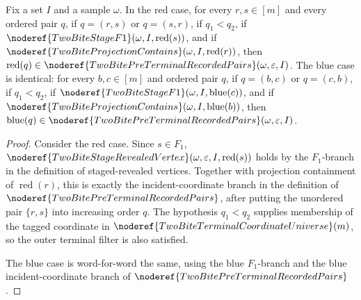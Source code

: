 \begin{helper}
Fix a set \(I\) and a sample \(\omega\).  In the red case, for every
\(r,s\in[m]\) and every ordered pair \(q\), if
\(q=(r,s)\) or \(q=(s,r)\), if \(q_1<q_2\), if
\(\noderef{TwoBiteStageF1}(\omega,I,\operatorname{red}(s))\), and if
\(\noderef{TwoBiteProjectionContains}(\omega,I,\operatorname{red}(r))\), then
\(\operatorname{red}(q)\in
\noderef{TwoBitePreTerminalRecordedPairs}(\omega,\varepsilon,I)\).  The blue
case is identical: for every \(b,c\in[m]\) and ordered pair \(q\), if
\(q=(b,c)\) or \(q=(c,b)\), if \(q_1<q_2\), if
\(\noderef{TwoBiteStageF1}(\omega,I,\operatorname{blue}(c))\), and if
\(\noderef{TwoBiteProjectionContains}(\omega,I,\operatorname{blue}(b))\), then
\(\operatorname{blue}(q)\in
\noderef{TwoBitePreTerminalRecordedPairs}(\omega,\varepsilon,I)\).
\end{helper}
\begin{proof}
Consider the red case.  Since \(s\in F_1\),
\(\noderef{TwoBiteStageRevealedVertex}(\omega,\varepsilon,I,\operatorname{red}(s))\)
holds by the \(F_1\)-branch in the definition of staged-revealed vertices.
Together with projection containment of \(\operatorname{red}(r)\), this is
exactly the incident-coordinate branch in the definition of
\(\noderef{TwoBitePreTerminalRecordedPairs}\), after putting the unordered
pair \(\{r,s\}\) into increasing order \(q\).  The hypothesis
\(q_1<q_2\) supplies membership of the tagged coordinate in
\(\noderef{TwoBiteTerminalCoordinateUniverse}(m)\), so the outer terminal
filter is also satisfied.

The blue case is word-for-word the same, using the blue \(F_1\)-branch and
the blue incident-coordinate branch of
\(\noderef{TwoBitePreTerminalRecordedPairs}\).
\end{proof}
